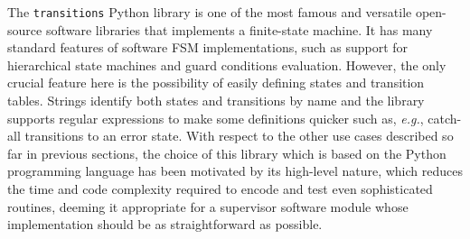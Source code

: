 The \texttt{transitions} \cite{yarkoni_transitions_2017} Python library is one of the most famous and versatile open-source software libraries that implements a finite-state machine. It has many standard features of software FSM implementations, such as support for hierarchical state machines and guard conditions evaluation. However, the only crucial feature here is the possibility of easily defining states and transition tables. Strings identify both states and transitions by name and the library supports regular expressions to make some definitions quicker such as, \emph{e.g.}, catch-all transitions to an error state. With respect to the other use cases described so far in previous sections, the choice of this library which is based on the Python programming language has been motivated by its high-level nature, which reduces the time and code complexity required to encode and test even sophisticated routines, deeming it appropriate for a supervisor software module whose implementation should be as straightforward as possible.

